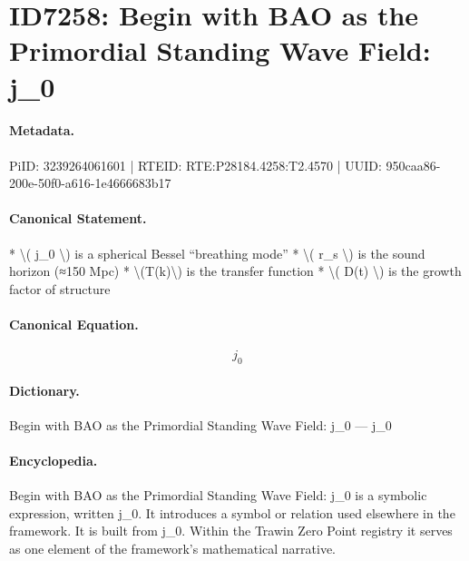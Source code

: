 \section*{ID7258: Begin with BAO as the Primordial Standing Wave Field: j\_0}
\paragraph{Metadata.}
PiID: 3239264061601 | RTEID: RTE:P28184.4258:T2.4570 | UUID: 950caa86-200e-50f0-a616-1e4666683b17

\paragraph{Canonical Statement.}
* \textbackslash{}( j\_0 \textbackslash{}) is a spherical Bessel “breathing mode” * \textbackslash{}( r\_s \textbackslash{}) is the sound horizon (≈150 Mpc) * \textbackslash{}(T(k)\textbackslash{}) is the transfer function * \textbackslash{}( D(t) \textbackslash{}) is the growth factor of structure

\paragraph{Canonical Equation.}
\[
j_0
\]

\paragraph{Dictionary.}
Begin with BAO as the Primordial Standing Wave Field: j\_0 — j\_0

\paragraph{Encyclopedia.}
Begin with BAO as the Primordial Standing Wave Field: j\_0 is a symbolic expression, written j\_0. It introduces a symbol or relation used elsewhere in the framework. It is built from j\_0. Within the Trawin Zero Point registry it serves as one element of the framework's mathematical narrative.
